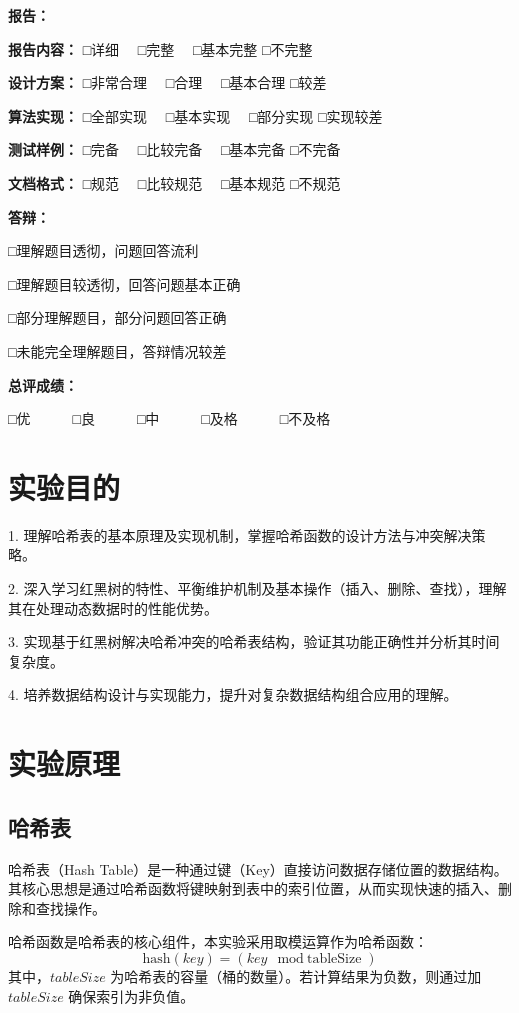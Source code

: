 \documentclass[12pt,a4paper]{article}
\begin{document}
\newpage
\begin{center}
\textbf{报告：}

\textbf{报告内容：} □详细　 □完整　 □基本完整 □不完整

\textbf{设计方案：} □非常合理　 □合理　 □基本合理 □较差

\textbf{算法实现：} □全部实现　 □基本实现　 □部分实现 □实现较差

\textbf{测试样例：} □完备　 □比较完备　 □基本完备 □不完备

\textbf{文档格式：} □规范　 □比较规范　 □基本规范 □不规范

\vspace{1cm}
\textbf{答辩：}

□理解题目透彻，问题回答流利

□理解题目较透彻，回答问题基本正确

□部分理解题目，部分问题回答正确

□未能完全理解题目，答辩情况较差

\vspace{1cm}
\textbf{总评成绩：}

□优　　　□良　　　□中　　　□及格　　　□不及格
\end{center}

\newpage
\section{实验目的}
1. 理解哈希表的基本原理及实现机制，掌握哈希函数的设计方法与冲突解决策略。

2. 深入学习红黑树的特性、平衡维护机制及基本操作（插入、删除、查找），理解其在处理动态数据时的性能优势。

3. 实现基于红黑树解决哈希冲突的哈希表结构，验证其功能正确性并分析其时间复杂度。

4. 培养数据结构设计与实现能力，提升对复杂数据结构组合应用的理解。

\section{实验原理}
\subsection{哈希表}
哈希表（Hash Table）是一种通过键（Key）直接访问数据存储位置的数据结构。其核心思想是通过哈希函数将键映射到表中的索引位置，从而实现快速的插入、删除和查找操作。

哈希函数是哈希表的核心组件，本实验采用取模运算作为哈希函数：
\[
\text{hash}(key) = (key \mod \text{tableSize})
\]
其中，\(tableSize\) 为哈希表的容量（桶的数量）。若计算结果为负数，则通过加 \(tableSize\) 确保索引为非负值。
\end{document}
